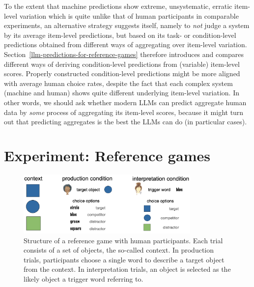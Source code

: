 \documentclass[fleqn]{article}
\begin{document}
To the extent that machine predictions show extreme, unsystematic, erratic item-level variation which is quite unlike that of human participants in comparable experiments, an alternative strategy suggests itself, namely to \emph{not} judge a system by its average item-level predictions, but based on its task- or condition-level predictions obtained from different ways of aggregating over item-level variation.
Section~\ref{llm-predictions-for-reference-games} therefore introduces and compares different ways of deriving condition-level predictions from (variable) item-level scores.
Properly constructed condition-level predictions might be more aligned with average human choice rates, despite the fact that each complex system (machine and human) shows quite different underlying item-level variation.
In other words, we should ask whether modern LLMs can predict aggregate human data by \emph{some} process of aggregating its item-level scores, because it might turn out that predicting aggregates is the best the LLMs can do (in particular cases).

\section{Experiment: Reference games}
\label{experiment-reference-games}

\begin{figure}
  \centering

  \includegraphics[width = 0.8\textwidth]{00-pics/reference-game.png}

  \caption{Structure of a reference game with human participants. Each trial consists of a set of objects, the so-called context. In production trials, participants choose a single word to describe a target object from the context. In interpretation trials, an object is selected as the likely object a trigger word referring to.}
  \label{fig:ref-game}
\end{figure}
\end{document}
